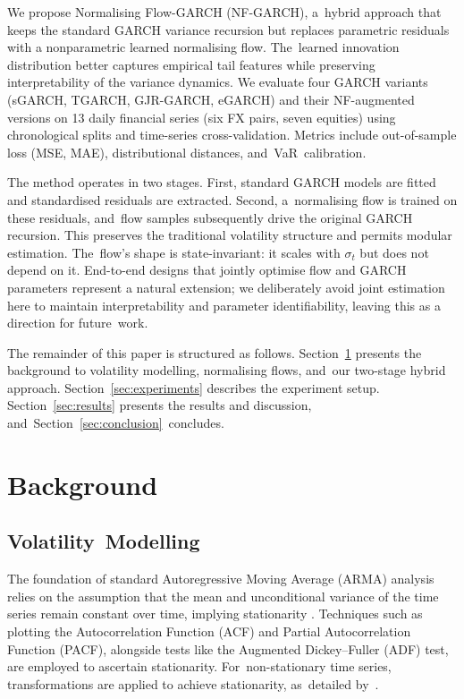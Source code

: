 \documentclass[risks,article,accept,pdftex,moreauthors]{Definitions/mdpi}
\begin{document}
We propose Normalising Flow-GARCH (NF-GARCH), a~hybrid approach that keeps the standard GARCH variance recursion but replaces parametric residuals with a nonparametric learned normalising flow. The~learned innovation distribution better captures empirical tail features while preserving interpretability of the variance dynamics. We evaluate four GARCH variants (sGARCH, TGARCH, GJR-GARCH, eGARCH) and their NF-augmented versions on 13 daily financial series (six FX pairs, seven equities) using chronological splits and time-series cross-validation. Metrics include out-of-sample loss (MSE, MAE), distributional distances, and~VaR~calibration.


The method operates in two stages. First, standard GARCH models are fitted and standardised residuals are extracted. Second, a~normalising flow is trained on these residuals, and~flow samples subsequently drive the original GARCH recursion. This preserves the traditional volatility structure and permits modular estimation. The~flow's shape is state-invariant: it scales with $\sigma_t$ but does not depend on it. End-to-end designs that jointly optimise flow and GARCH parameters represent a natural extension; we deliberately avoid joint estimation here to maintain interpretability and parameter identifiability, leaving this as a direction for future~work.

The remainder of this paper is structured as follows. Section~\ref{sec:background} presents the background to volatility modelling, normalising flows, and~our two-stage hybrid approach. Section~\ref{sec:experiments} describes the experiment setup. Section~\ref{sec:results} presents the results and discussion, and~\mbox{Section~\ref{sec:conclusion} concludes.}

\section{Background}
\label{sec:background}
\unskip

\subsection{Volatility~Modelling}

The foundation of standard Autoregressive Moving Average (ARMA) analysis relies on the assumption that the mean and unconditional variance of the time series remain constant over time, implying stationarity \citep{BoxJenkins1976, pankratz1991forecasting}. Techniques such as plotting the Autocorrelation Function (ACF) and Partial Autocorrelation Function (PACF), alongside tests like the Augmented Dickey--Fuller (ADF) test, are employed to ascertain stationarity. For~non-stationary time series, transformations are applied to achieve stationarity, as~detailed by~\cite{pankratz1991forecasting}.
\end{document}
